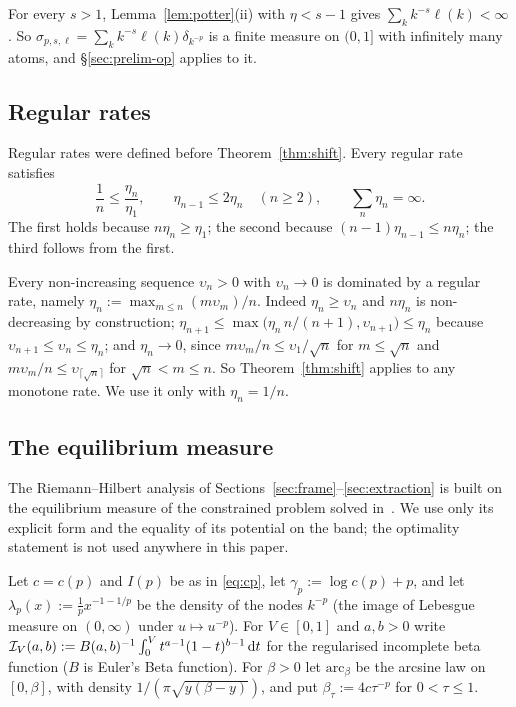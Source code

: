 For every $s>1$, Lemma~\ref{lem:potter}(ii) with $\eta<s-1$ gives $\sum_kk^{-s}\ell(k)<\infty$. So
$\sigma_{p,s,\ell}=\sum_kk^{-s}\ell(k)\delta_{k^{-p}}$ is a finite measure on $(0,1]$ with infinitely many atoms, and
\S\ref{sec:prelim-op} applies to it.

\subsection{Regular rates}\label{sec:prelim-rates}

\label{def:regular}%
Regular rates were defined before Theorem~\ref{thm:shift}. Every regular rate satisfies
\begin{equation}\label{eq:regular-facts}
  \frac1n\le\frac{\eta_n}{\eta_1},\qquad \eta_{n-1}\le2\eta_n\quad(n\ge2),\qquad \sum_n\eta_n=\infty .
\end{equation}
The first holds because $n\eta_n\ge\eta_1$; the second because $(n-1)\eta_{n-1}\le n\eta_n$; the third follows from
the first.

\begin{remark}\label{rem:majorant}
Every non-increasing sequence $\upsilon_n>0$ with $\upsilon_n\to0$ is dominated by a regular rate, namely
$\eta_n:=\max_{m\le n}(m\upsilon_m)/n$. Indeed $\eta_n\ge\upsilon_n$ and $n\eta_n$ is non-decreasing by construction;
$\eta_{n+1}\le\max\bigl(\eta_n\,n/(n+1),\upsilon_{n+1}\bigr)\le\eta_n$ because $\upsilon_{n+1}\le\upsilon_n\le\eta_n$; and
$\eta_n\to0$, since $m\upsilon_m/n\le\upsilon_1/\sqrt n$ for $m\le\sqrt n$ and $m\upsilon_m/n\le\upsilon_{\lceil\sqrt n\rceil}$
for $\sqrt n<m\le n$. So Theorem~\ref{thm:shift} applies to any monotone rate. We use it only with $\eta_n=1/n$.
\end{remark}

\subsection{The equilibrium measure}\label{sec:prelim-eq}

The Riemann--Hilbert analysis of Sections~\ref{sec:frame}--\ref{sec:extraction} is built on the equilibrium measure
of the constrained problem solved in~\cite{Paper1}. We use only its explicit form and the equality of its potential on the band; the optimality
statement \cite[Theorem~1.3(iii)]{Paper1} is not used anywhere in this paper.

Let $c=c(p)$ and $I(p)$ be as in \eqref{eq:cp}, let $\gamma_p:=\log c(p)+p$, and let $\lambda_p(x):=\frac1px^{-1-1/p}$ be the density
of the nodes $k^{-p}$ (the image of Lebesgue measure on $(0,\infty)$ under $u\mapsto u^{-p}$). For $V\in[0,1]$ and
$a,b>0$ write $\mathcal I_V(a,b):=B(a,b)^{-1}\int_0^Vt^{a-1}(1-t)^{b-1}\,\mathrm{d} t$ for the regularised incomplete beta
function ($B$ is Euler's Beta function). For $\beta>0$ let $\mathrm{arc}_\beta$ be the arcsine law on $[0,\beta]$, with
density $1/(\pi\sqrt{y(\beta-y)})$, and put $\beta_\tau:=4c\tau^{-p}$ for $0<\tau\le1$.

